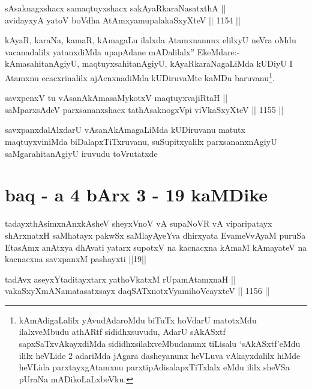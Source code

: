\begin{shl}
sAsaknagxshacx samaqtuyxshacx sakAyaRkaraNasatxthA || \\
avidayxyA yatoV boVdha AtAmx\s yamupalakaSxyXteV \hfill || 1154 ||  
\end{shl}

\begin{artha}
kAyaR, karaNa, kamaR, kAmagaLu ilalxda Atamxnanunx elilxyU neVra oMdu vacanadalilx yatanxdiMda upapAdane mADalilalx'' EkeMdare:- kAmasahitanAgiyU, maqtuyxsahitanAgiyU, kAyaRkaraNagaLiMda kUDiyU I Atamxnu ecacxrinalilx ajAcnxnadiMda kUDiruvaMte kaMDu baruvanu\footnote{kAmAdigaLalilx yAvudAdaroMdu biTuTx hoVdarU matotxMdu ilalxveMbudu athARtf sididhxsuvudu, AdarU sAkASxtf sapxSaTxvAkayxdiMda sididhxsilalxveMbudanunx tiLisalu `sAkASxtf'eMdu ililx heVLide 2 adariMda jAgara dasheyanunx heVLuva vAkayxdalilx hiMde heVLida parxtayxgAtamxnu parxtipAdisalapxTiTxlalx eMdu ililx sheVSa pUraNa mADikoLaLxbeVku.}.
\end{artha}


\begin{shl}
savxpenxV tu vAsanAkAmasaMykotxV maqtuyxvajiRtaH || \\
saMparxsAdeV parxsananxshacx tathA\s saknogxV\s pi viVkaSxyXteV \hfill || 1155 ||  
\end{shl}

\begin{artha}
savxpanxdalAlxdarU vAsanAkAmagaLiMda kUDiruvanu matutx maqtuyxviniMda biDalapxTiTxruvanu, suSupitxyalilx parxsananxnAgiyU saMgarahitanAgiyU iruvudu toVrutatxde
\end{artha}

\section*{baq - a 4 bArx 3 - 19 kaMDike}

\begin{shl}
tadayxthAsimxnAnxkAsheV sheyxVnoV vA supaNoVR vA viparipatayx shArxnatxH saMhatayx pakwSx saMlayAyeYva dhirxyata EvameVvAyaM puruSa EtasAmx anAtxya dhAvati yatarx supotxV na kacnacxna kAmaM kAmayateV na kacnacxna savxpanxM pashayxti ||19||
\end{shl}


\begin{shl}
tadAvx aseyxYtaditayxtarx yathoVkatxM rUpamAtamxnaH || \\
vakaSxyXmANamatasatxsayx daqSATxnotxV\s yamihoVcayxteV \hfill || 1156 ||  
\end{shl}

